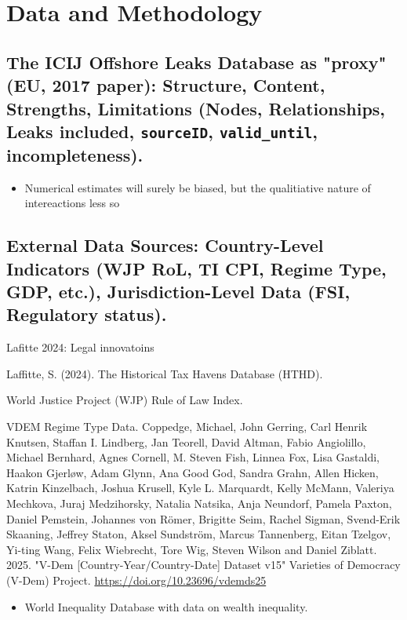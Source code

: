 \chapter{Data and Methodology}
\label{chap:data_methodology}

\section{The ICIJ Offshore Leaks Database as "proxy" (EU, 2017 paper): Structure, Content, Strengths, Limitations (Nodes, Relationships, Leaks included, \texttt{sourceID}, \texttt{valid\_until}, incompleteness).} %
\label{sec:3_1}
\begin{itemize}[leftmargin=*]
    \item Numerical estimates will surely be biased, but the qualitiative nature of intereactions less so
\end{itemize}

\section{External Data Sources: Country-Level Indicators (WJP RoL, TI CPI, Regime Type, GDP, etc.), Jurisdiction-Level Data (FSI, Regulatory status).}
\label{sec:3_2}
Lafitte 2024: Legal innovatoins

Laffitte, S. (2024). The Historical Tax Havens Database (HTHD).

World Justice Project (WJP) Rule of Law Index.

VDEM Regime Type Data.
Coppedge, Michael, John Gerring, Carl Henrik Knutsen, Staffan I. Lindberg, Jan Teorell, David Altman, Fabio Angiolillo, Michael Bernhard, Agnes Cornell, M. Steven Fish, Linnea Fox, Lisa Gastaldi, Haakon Gjerløw, Adam Glynn, Ana Good God, Sandra Grahn, Allen Hicken, Katrin Kinzelbach, Joshua Krusell, Kyle L. Marquardt, Kelly McMann, Valeriya Mechkova, Juraj Medzihorsky, Natalia Natsika, Anja Neundorf, Pamela Paxton, Daniel Pemstein, Johannes von Römer, Brigitte Seim, Rachel Sigman, Svend-Erik Skaaning, Jeffrey Staton, Aksel Sundström, Marcus Tannenberg, Eitan Tzelgov, Yi-ting Wang, Felix Wiebrecht, Tore Wig, Steven Wilson and Daniel Ziblatt. 2025. "V-Dem [Country-Year/Country-Date] Dataset v15" Varieties of Democracy (V-Dem) Project. \url{https://doi.org/10.23696/vdemds25} %

\begin{itemize}[leftmargin=*]
    \item World Inequality Database with data on wealth inequality.
\end{itemize}

